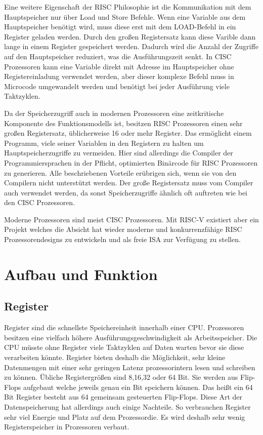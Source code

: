 \documentclass[12pt]{article}
\begin{document}
\noindent Eine weitere Eigenschaft der RISC Philosophie ist die Kommunikation mit dem Hauptspeicher nur über Load und Store Befehle. Wenn eine Variable aus dem Hauptspeicher benötigt wird, muss diese erst mit dem LOAD-Befehl in ein Register geladen werden. Durch den großen Registersatz kann diese Varible dann lange in einem Register gespeichert werden. Dadurch wird die Anzahl der Zugriffe auf den Hauptspeicher reduziert, was die Ausführungszeit senkt. In CISC Prozessoren kann eine Variable direkt mit Adresse im Hauptspeicher ohne Registereinladung verwendet werden, aber dieser komplexe Befehl muss in Microcode umgewandelt werden und benötigt bei jeder Ausführung viele Taktzyklen.\cite[S.102]{mikroprozessortechnik2011}

\par \bigskip
\noindent Da der Speicherzugriff auch in modernen Prozessoren eine zeitkritische Komponente des Funktionsmodells ist, besitzen RISC Prozessoren einen sehr großen Registersatz, üblicherweise 16 oder mehr Register. Das ermöglicht einem Programm, viele seiner Variablen in den Registern zu halten um Hauptspeicherzugriffe zu vermeiden. Hier sind allerdings die Compiler der Programmiersprachen in der Pflicht, optimierten Binärcode für RISC Prozessoren zu generieren. Alle beschriebenen Vorteile erübrigen sich, wenn sie von den Compilern nicht unterstützt werden. Der große Registersatz muss vom Compiler auch verwendet werden, da sonst Speicherzugriffe ähnlich oft auftreten wie bei den CISC Prozessoren. \cite[S.102]{mikroprozessortechnik2011}
\par \bigskip
\noindent Moderne Prozessoren sind meist CISC Prozessoren. Mit RISC-V existiert aber ein Projekt welches die Absicht hat wieder moderne und konkurrenzfähige RISC Prozessorendesigns zu entwickeln und als freie ISA zur Verfügung zu stellen. 

\newpage
\section{Aufbau und Funktion}
\subsection{Register} \label{sub:register}
Register sind die schnellste Speichereinheit innerhalb einer CPU. Prozessoren besitzen eine vielfach höhere Ausführungsgeschwindigkeit als Arbeitsspeicher. Die CPU müsste ohne Register viele Taktzyklen auf Daten warten bevor sie diese verarbeiten könnte. Register bieten deshalb die Möglichkeit, sehr kleine Datenmengen mit einer sehr geringen Latenz prozessorintern lesen und schreiben zu können. Übliche Registergrößen sind 8,16,32 oder 64 Bit.\cite{mikroprozessortechnik2011} Sie werden aus Flip-Flops aufgebaut welche jeweils genau ein Bit speichern können. Das heißt ein 64 Bit Register besteht aus 64 gemeinsam gesteuerten Flip-Flops.\cite{mikroprozessortechnik2011} Diese Art der Datenspeicherung hat allerdings auch einige Nachteile. So verbrauchen Register sehr viel Energie und Platz auf dem Prozessordie. Es wird deshalb sehr wenig Registerspeicher in Prozessoren verbaut.
\end{document}
